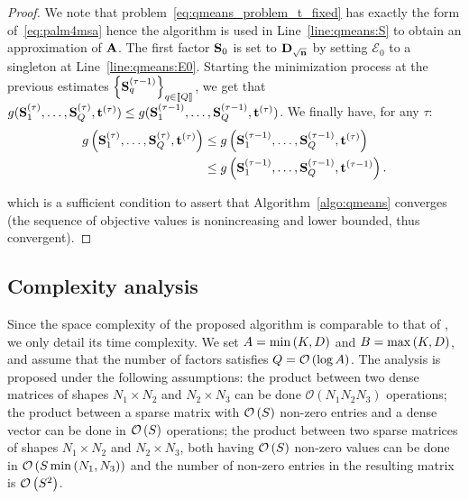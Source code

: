 \begin{proof}
We note that  problem~\eqref{eq:qmeans_problem_t_fixed} has exactly the form of~\eqref{eq:palm4msa} hence the \palm algorithm is used in Line~\ref{line:qmeans:S} to obtain an approximation of ${\mathbf{A}}$. The first factor ${\mathbf{S}}_0$ is set to ${\mathbf{D}}_{\sqrt{{\mathbf{n}}}}$ by setting $\mathcal{E}_0$ to a singleton at Line~\ref{line:qmeans:E0}. Starting the minimization process at the previous estimates $\left \lbrace {\mathbf{S}}_q^{(\tau-1)}\right \rbrace_{q\in\left \llbracket Q\right \rrbracket}$, we get that $g({\mathbf{S}}_1^{(\tau)}, \ldots,{\mathbf{S}}_Q^{(\tau)}, {\mathbf{t}}^{(\tau)}) \leq g({\mathbf{S}}_1^{(\tau-1)}, \ldots,{\mathbf{S}}_Q^{(\tau-1)}, {\mathbf{t}}^{(\tau)})$.
We finally have, for any $\tau$:
\small
\begin{align*}
g\left ({\mathbf{S}}_1^{(\tau)}, \ldots,{\mathbf{S}}_Q^{(\tau)}, {\mathbf{t}}^{(\tau)}\right ) & \leq g\left ({\mathbf{S}}_1^{(\tau-1)}, \ldots,{\mathbf{S}}_Q^{(\tau-1)}, {\mathbf{t}}^{(\tau)}\right ) \\
& \leq g\left ({\mathbf{S}}_1^{(\tau-1)}, \ldots,{\mathbf{S}}_Q^{(\tau-1)}, {\mathbf{t}}^{(\tau-1)}\right ) .
\end{align*}
\normalsize

which is a sufficient condition to assert that Algorithm~\ref{algo:qmeans} converges (the sequence of objective values is nonincreasing and lower bounded, thus convergent).
\end{proof}


\subsection{Complexity analysis}
\label{sec:qkmeans:complexity}

Since the space complexity of the proposed \qkmeans algorithm is comparable to that of \kmeans, we only detail its time complexity. We set $A=\min\left (K, D\right )$ and $B=\max\left (K, D\right )$, and assume that the number of factors satisfies $Q=\mathcal{O}\left(\log A\right)$.
The analysis is proposed under the following assumptions: the product between two dense matrices of shapes ${N_1\times N_2}$ and ${N_2\times N_3}$ can be done $\mathcal{O}\left (N_1 N_2 N_3 \right )$ operations; 
the product between a sparse matrix with $\mathcal{O}\left(S\right)$ non-zero entries and a dense vector can be done in $\mathcal{O}\left(S\right)$ operations; 
the product between two sparse matrices of shapes ${N_1\times N_2}$ and ${N_2\times N_3}$, both having $\mathcal{O}\left(S\right)$ non-zero values can be done in $\mathcal{O}\left(S \min\left (N_1, N_3\right )\right)$ and the number of non-zero entries in the resulting matrix is $\mathcal{O}\left(S^2\right)$.


